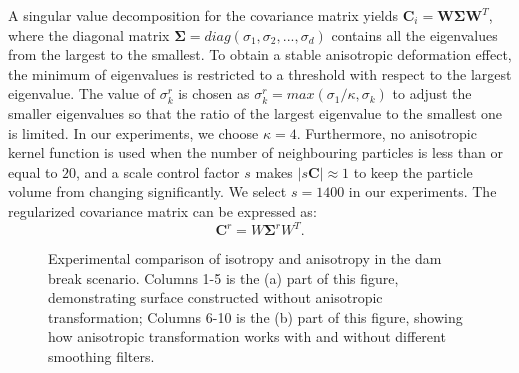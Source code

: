 \documentclass[times,twocolumn,final]{elsarticle}
\begin{document}
A singular value decomposition for the covariance matrix yields $\mathbf{C}_{i}=\mathbf{W} \mathbf{\Sigma} \mathbf{W}^{T}$, where the diagonal matrix $\mathbf{\Sigma} = diag(\sigma_1,\sigma_2,...,\sigma_d)$ contains all the eigenvalues from the largest to the smallest. To obtain a stable anisotropic deformation effect, the minimum of eigenvalues is restricted to a threshold with respect to the largest eigenvalue. The value of $\sigma_k^r$ is chosen as $\sigma_k^r=max(\sigma_1/\kappa,\sigma_k)$ to adjust the smaller eigenvalues so that the ratio of the largest eigenvalue to the smallest one is limited. In our experiments, we choose $\kappa=4$. Furthermore, no anisotropic kernel function is used when the number of neighbouring particles is less than or equal to $20$, and a scale control factor $s$ makes $|s \mathbf{C}| \approx 1$ to keep the particle volume from changing significantly. We select $s=1400$ in our experiments. The regularized covariance matrix can be expressed as:
\begin{equation}
\mathbf{C}^{r}=W \mathbf{\Sigma}^{r} W^{T}.
\end{equation}

\begin{figure}[!t]
    \centering
    \caption{Experimental comparison of isotropy and anisotropy in the dam break scenario. Columns 1-5 is the (a) part of this figure, demonstrating surface constructed without anisotropic transformation; Columns 6-10 is the (b) part of this figure, showing how anisotropic transformation works with and without different smoothing filters.}
    \label{fig:ball_iso_and_aniso}
\end{figure}
\end{document}
